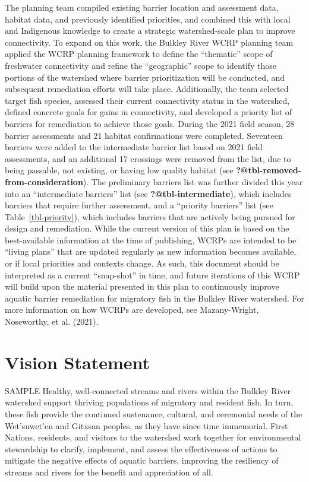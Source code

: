 \documentclass[
  letterpaper,
  DIV=11,
  numbers=noendperiod]{scrreprt}
\begin{document}
The planning team compiled existing barrier location and assessment
data, habitat data, and previously identified priorities, and combined
this with local and Indigenous knowledge to create a strategic
watershed-scale plan to improve connectivity. To expand on this work,
the Bulkley River WCRP planning team applied the WCRP planning framework
to define the ``thematic'' scope of freshwater connectivity and refine
the ``geographic'' scope to identify those portions of the watershed
where barrier prioritization will be conducted, and subsequent
remediation efforts will take place. Additionally, the team selected
target fish species, assessed their current connectivity status in the
watershed, defined concrete goals for gains in connectivity, and
developed a priority list of barriers for remediation to achieve those
goals. During the 2021 field season, 28 barrier assessments and 21
habitat confirmations were completed. Seventeen barriers were added to
the intermediate barrier list based on 2021 field assessments, and an
additional 17 crossings were removed from the list, due to being
passable, not existing, or having low quality habitat (see
\textbf{?@tbl-removed-from-consideration}). The preliminary barriers
list was further divided this year into an ``intermediate barriers''
list (see \textbf{?@tbl-intermediate}), which includes barriers that
require further assessment, and a ``priority barriers'' list (see
Table~\ref{tbl-priority}), which includes barriers that are actively
being pursued for design and remediation. While the current version of
this plan is based on the best-available information at the time of
publishing, WCRPs are intended to be ``living plans'' that are updated
regularly as new information becomes available, or if local priorities
and contexts change. As such, this document should be interpreted as a
current ``snap-shot'' in time, and future iterations of this WCRP will
build upon the material presented in this plan to continuously improve
aquatic barrier remediation for migratory fish in the Bulkley River
watershed. For more information on how WCRPs are developed, see
Mazany-Wright, Noseworthy, et al. (2021).

\section*{Vision Statement}\label{vision-statement}


SAMPLE Healthy, well-connected streams and rivers within the Bulkley
River watershed support thriving populations of migratory and resident
fish. In turn, these fish provide the continued sustenance, cultural,
and ceremonial needs of the Wet'suwet'en and Gitxsan peoples, as they
have since time immemorial. First Nations, residents, and visitors to
the watershed work together for environmental stewardship to clarify,
implement, and assess the effectiveness of actions to mitigate the
negative effects of aquatic barriers, improving the resiliency of
streams and rivers for the benefit and appreciation of all.
\end{document}
